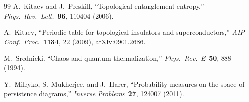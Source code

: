 \documentclass[12pt, a4paper]{article}
\begin{document}
\begin{thebibliography}{99}
A.~Kitaev and J.~Preskill, ``Topological entanglement entropy,'' \textit{Phys.\ Rev.\ Lett.}\ \textbf{96}, 110404 (2006).

A.~Kitaev, ``Periodic table for topological insulators and superconductors,'' \textit{AIP Conf.\ Proc.}\ \textbf{1134}, 22 (2009), arXiv:0901.2686.

M.~Srednicki, ``Chaos and quantum thermalization,'' \textit{Phys.\ Rev.\ E}\ \textbf{50}, 888 (1994).

Y.~Mileyko, S.~Mukherjee, and J.~Harer, ``Probability measures on the space of persistence diagrams,'' \textit{Inverse Problems}\ \textbf{27}, 124007 (2011).

\end{thebibliography}
\end{document}
